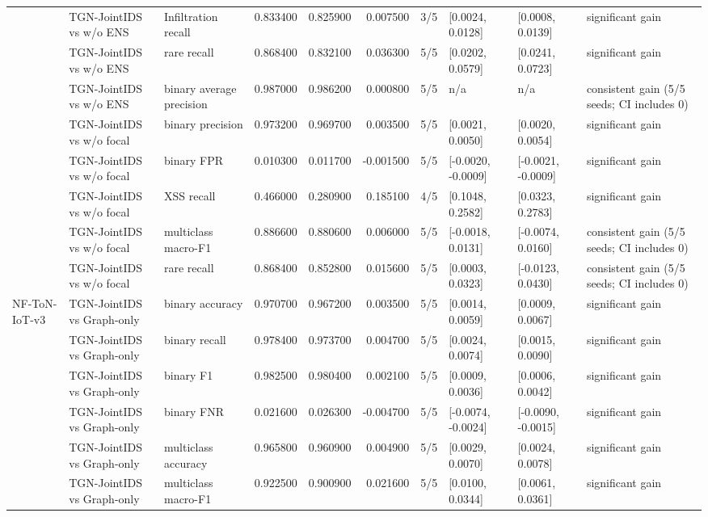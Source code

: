 \begin{table}
\begin{tabular}{lllrrrllll}
 & TGN-JointIDS vs w/o ENS & Infiltration recall & 0.833400 & 0.825900 & 0.007500 & 3/5 & [0.0024, 0.0128] & [0.0008, 0.0139] & significant gain \\
 & TGN-JointIDS vs w/o ENS & rare recall & 0.868400 & 0.832100 & 0.036300 & 5/5 & [0.0202, 0.0579] & [0.0241, 0.0723] & significant gain \\
 & TGN-JointIDS vs w/o ENS & binary average precision & 0.987000 & 0.986200 & 0.000800 & 5/5 & n/a & n/a & consistent gain (5/5 seeds; CI includes 0) \\
 & TGN-JointIDS vs w/o focal & binary precision & 0.973200 & 0.969700 & 0.003500 & 5/5 & [0.0021, 0.0050] & [0.0020, 0.0054] & significant gain \\
 & TGN-JointIDS vs w/o focal & binary FPR & 0.010300 & 0.011700 & -0.001500 & 5/5 & [-0.0020, -0.0009] & [-0.0021, -0.0009] & significant gain \\
 & TGN-JointIDS vs w/o focal & XSS recall & 0.466000 & 0.280900 & 0.185100 & 4/5 & [0.1048, 0.2582] & [0.0323, 0.2783] & significant gain \\
 & TGN-JointIDS vs w/o focal & multiclass macro-F1 & 0.886600 & 0.880600 & 0.006000 & 5/5 & [-0.0018, 0.0131] & [-0.0074, 0.0160] & consistent gain (5/5 seeds; CI includes 0) \\
 & TGN-JointIDS vs w/o focal & rare recall & 0.868400 & 0.852800 & 0.015600 & 5/5 & [0.0003, 0.0323] & [-0.0123, 0.0430] & consistent gain (5/5 seeds; CI includes 0) \\
\cline{1-10}
\multirow[t]{27}{*}{NF-ToN-IoT-v3} & TGN-JointIDS vs Graph-only & binary accuracy & 0.970700 & 0.967200 & 0.003500 & 5/5 & [0.0014, 0.0059] & [0.0009, 0.0067] & significant gain \\
 & TGN-JointIDS vs Graph-only & binary recall & 0.978400 & 0.973700 & 0.004700 & 5/5 & [0.0024, 0.0074] & [0.0015, 0.0090] & significant gain \\
 & TGN-JointIDS vs Graph-only & binary F1 & 0.982500 & 0.980400 & 0.002100 & 5/5 & [0.0009, 0.0036] & [0.0006, 0.0042] & significant gain \\
 & TGN-JointIDS vs Graph-only & binary FNR & 0.021600 & 0.026300 & -0.004700 & 5/5 & [-0.0074, -0.0024] & [-0.0090, -0.0015] & significant gain \\
 & TGN-JointIDS vs Graph-only & multiclass accuracy & 0.965800 & 0.960900 & 0.004900 & 5/5 & [0.0029, 0.0070] & [0.0024, 0.0078] & significant gain \\
 & TGN-JointIDS vs Graph-only & multiclass macro-F1 & 0.922500 & 0.900900 & 0.021600 & 5/5 & [0.0100, 0.0344] & [0.0061, 0.0361] & significant gain \\

\end{tabular}
\end{table}
